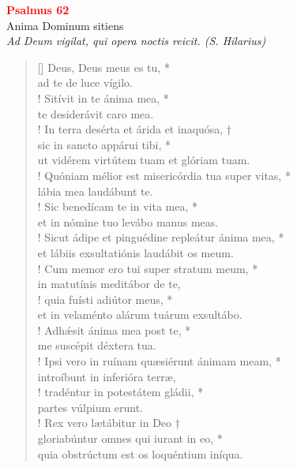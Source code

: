 


\def\greinitialformat#1{%
{\fontsize{39}{39}\selectfont #1}%
}




\vspace{0.3cm}
\begin{center}
 \textcolor{red}{\large \bf Psalmus 62}\\
Anima Dominum sitiens\\
\textit{\small Ad Deum vigilat, qui opera noctis reicit. (S. Hilarius)}
\end{center}
\begin{verse}[\versewidth]
Deus, Deus meus es tu, *\\
ad te de luce vígilo.\\!
\vin Sitívit in te ánima mea, *\\
\vin te desiderávit caro mea.\\!
In terra desérta et árida et inaquósa, †\\
sic in sancto appárui tibi, *\\
ut vidérem virtútem tuam et glóriam tuam.\\!
\vin Quóniam mélior est misericórdia tua super vitas, *\\
\vin lábia mea laudábunt te.\\!
Sic benedícam te in vita mea, *\\
et in nómine tuo levábo manus meas.\\!
\vin Sicut ádipe et pinguédine repleátur ánima mea, *\\
\vin et lábiis exsultatiónis laudábit os meum.\\!
Cum memor ero tui super stratum meum, *\\
in matutínis meditábor de te,\\!
\vin quia fuísti adiútor meus, *\\
\vin et in velaménto alárum tuárum exsultábo.\\!
Adh\'{æ}sit ánima mea post te, *\\
me suscépit déxtera tua.\\!
\vin Ipsi vero in ruínam quæsiérunt ánimam meam, *\\
\vin introíbunt in inferióra terræ,\\!
tradéntur in potestátem gládii, *\\
partes vúlpium erunt.\\!
\vin Rex vero lætábitur in Deo †\\
\vin gloriabúntur omnes qui iurant in eo, *\\
\vin quia obstrúctum est os loquéntium iníqua.\\
\end{verse}
\vspace{1cm}


